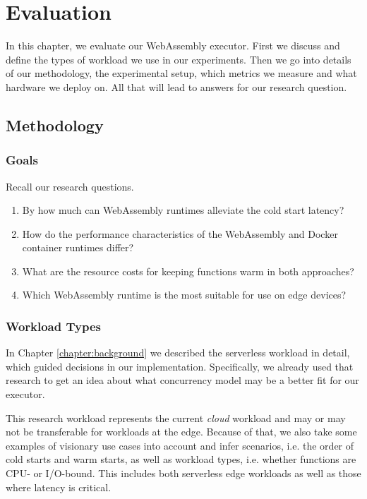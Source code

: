 \chapter{Evaluation}
\label{chapter:evaluation}

In this chapter, we evaluate our WebAssembly executor. First we discuss and define the types of workload we use in our experiments. Then we go into details of our methodology, the experimental setup, which metrics we measure and what hardware we deploy on. All that will lead to answers for our research question.

\section{Methodology}

\subsection{Goals}

Recall our research questions.

\begin{enumerate}
    \item By how much can WebAssembly runtimes alleviate the cold start latency?
  
    \item How do the performance characteristics of the WebAssembly and Docker container runtimes differ?
  
    \item What are the resource costs for keeping functions warm in both approaches?
  
    \item Which WebAssembly runtime is the most suitable for use on edge devices?
\end{enumerate}


\subsection{Workload Types}

In Chapter \ref{chapter:background} we described the serverless workload in detail, which guided decisions in our implementation. Specifically, we already used that research to get an idea about what concurrency model may be a better fit for our executor.

This research workload represents the current \emph{cloud} workload and may or may not be transferable for workloads at the edge. Because of that, we also take some examples of visionary use cases into account and infer scenarios, i.e. the order of cold starts and warm starts, as well as workload types, i.e. whether functions are CPU- or I/O-bound. This includes both serverless edge workloads as well as those where latency is critical.

